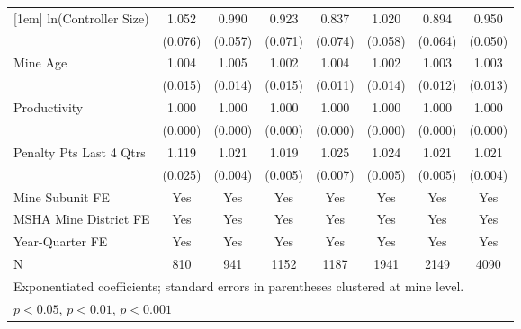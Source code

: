 {\begin{tabular}{l*{7}{c}}
[1em]
ln(Controller Size)      &       1.052         &       0.990         &       0.923         &       0.837\sym{*}  &       1.020         &       0.894         &       0.950         \\
                         &     (0.076)         &     (0.057)         &     (0.071)         &     (0.074)         &     (0.058)         &     (0.064)         &     (0.050)         \\
[1em]
Mine Age                 &       1.004         &       1.005         &       1.002         &       1.004         &       1.002         &       1.003         &       1.003         \\
                         &     (0.015)         &     (0.014)         &     (0.015)         &     (0.011)         &     (0.014)         &     (0.012)         &     (0.013)         \\
[1em]
Productivity             &       1.000         &       1.000         &       1.000         &       1.000         &       1.000         &       1.000         &       1.000         \\
                         &     (0.000)         &     (0.000)         &     (0.000)         &     (0.000)         &     (0.000)         &     (0.000)         &     (0.000)         \\
[1em]
Penalty Pts Last 4 Qtrs  &       1.119\sym{***}&       1.021\sym{***}&       1.019\sym{***}&       1.025\sym{***}&       1.024\sym{***}&       1.021\sym{***}&       1.021\sym{***}\\
                         &     (0.025)         &     (0.004)         &     (0.005)         &     (0.007)         &     (0.005)         &     (0.005)         &     (0.004)         \\
[1em]
Mine Subunit FE          &         Yes         &         Yes         &         Yes         &         Yes         &         Yes         &         Yes         &         Yes         \\
[1em]
MSHA Mine District FE    &         Yes         &         Yes         &         Yes         &         Yes         &         Yes         &         Yes         &         Yes         \\
[1em]
Year-Quarter FE          &         Yes         &         Yes         &         Yes         &         Yes         &         Yes         &         Yes         &         Yes         \\
\hline
N                        &         810         &         941         &        1152         &        1187         &        1941         &        2149         &        4090         \\
\hline\hline
\multicolumn{8}{l}{\footnotesize Exponentiated coefficients; standard errors in parentheses clustered at mine level.}\\
\multicolumn{8}{l}{\footnotesize \sym{*} \(p<0.05\), \sym{**} \(p<0.01\), \sym{***} \(p<0.001\)}\\
\end{tabular}
}
